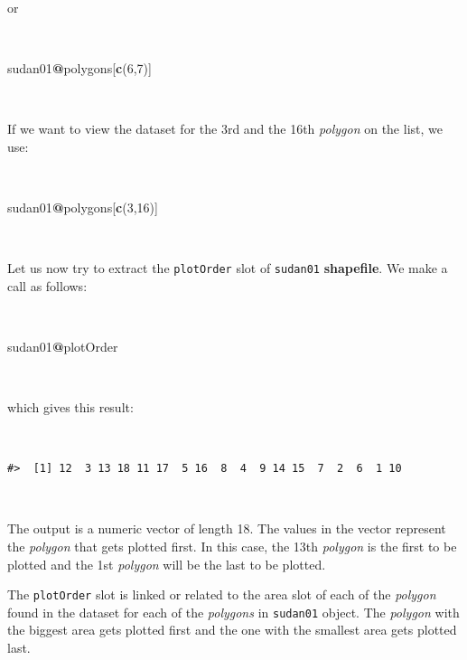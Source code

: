 \documentclass[12pt,a4paper,a4paper]{book}
\newenvironment{Shaded}{\begin{snugshade}}{\end{snugshade}}
\newcommand{\KeywordTok}[1]{\textcolor[rgb]{0.13,0.29,0.53}{\textbf{#1}}}
\newcommand{\DecValTok}[1]{\textcolor[rgb]{0.00,0.00,0.81}{#1}}
\newcommand{\OperatorTok}[1]{\textcolor[rgb]{0.81,0.36,0.00}{\textbf{#1}}}
\newcommand{\NormalTok}[1]{#1}
\theoremstyle{definition}
\theoremstyle{definition}
\theoremstyle{definition}
\theoremstyle{remark}
\begin{document}
~

or

~

\begin{Shaded}
\begin{Highlighting}[]
\NormalTok{sudan01}\OperatorTok{@}\NormalTok{polygons[}\KeywordTok{c}\NormalTok{(}\DecValTok{6}\NormalTok{,}\DecValTok{7}\NormalTok{)]}
\end{Highlighting}
\end{Shaded}

~

If we want to view the dataset for the 3rd and the 16th \emph{polygon}
on the list, we use:

~

\begin{Shaded}
\begin{Highlighting}[]
\NormalTok{sudan01}\OperatorTok{@}\NormalTok{polygons[}\KeywordTok{c}\NormalTok{(}\DecValTok{3}\NormalTok{,}\DecValTok{16}\NormalTok{)]}
\end{Highlighting}
\end{Shaded}

~

Let us now try to extract the \texttt{plotOrder} slot of
\texttt{sudan01} \textbf{shapefile}. We make a call as follows:

~

\begin{Shaded}
\begin{Highlighting}[]
\NormalTok{sudan01}\OperatorTok{@}\NormalTok{plotOrder}
\end{Highlighting}
\end{Shaded}

~

which gives this result:

~

\begin{verbatim}
#>  [1] 12  3 13 18 11 17  5 16  8  4  9 14 15  7  2  6  1 10
\end{verbatim}

~

The output is a numeric vector of length 18. The values in the vector
represent the \emph{polygon} that gets plotted first. In this case, the
13th \emph{polygon} is the first to be plotted and the 1st
\emph{polygon} will be the last to be plotted.

The \texttt{plotOrder} slot is linked or related to the area slot of
each of the \emph{polygon} found in the dataset for each of the
\emph{polygons} in \texttt{sudan01} object. The \emph{polygon} with the
biggest area gets plotted first and the one with the smallest area gets
plotted last.
\end{document}
